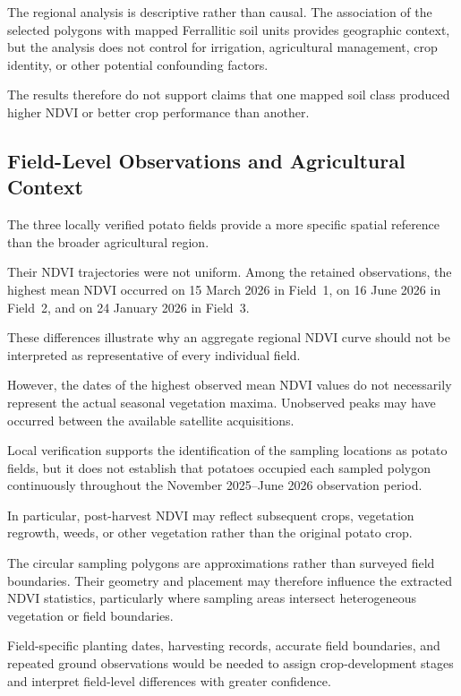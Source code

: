The regional analysis is descriptive rather
than causal. The association of the selected
polygons with mapped Ferrallitic soil units
provides geographic context, but the analysis
does not control for irrigation, agricultural
management, crop identity, or other potential
confounding factors.

The results therefore do not support claims
that one mapped soil class produced higher
NDVI or better crop performance than another.


\subsection{Field-Level Observations and Agricultural Context}

The three locally verified potato fields
provide a more specific spatial reference
than the broader agricultural region.

Their NDVI trajectories were not uniform.
Among the retained observations, the highest
mean NDVI occurred on 15 March 2026 in Field~1,
on 16 June 2026 in Field~2, and on
24 January 2026 in Field~3.

These differences illustrate why an aggregate
regional NDVI curve should not be interpreted
as representative of every individual field.

However, the dates of the highest observed
mean NDVI values do not necessarily represent
the actual seasonal vegetation maxima.
Unobserved peaks may have occurred between
the available satellite acquisitions.

Local verification supports the identification
of the sampling locations as potato fields,
but it does not establish that potatoes
occupied each sampled polygon continuously
throughout the November 2025--June 2026
observation period.

In particular, post-harvest NDVI may reflect
subsequent crops, vegetation regrowth, weeds,
or other vegetation rather than the original
potato crop.

The circular sampling polygons are
approximations rather than surveyed field
boundaries. Their geometry and placement
may therefore influence the extracted NDVI
statistics, particularly where sampling
areas intersect heterogeneous vegetation
or field boundaries.

Field-specific planting dates, harvesting
records, accurate field boundaries, and
repeated ground observations would be
needed to assign crop-development stages
and interpret field-level differences
with greater confidence.


